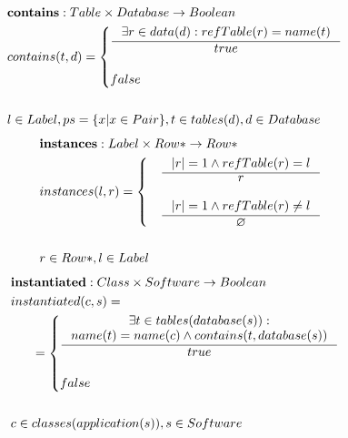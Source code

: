\documentclass[11pt]{article}
\begin{document}
\begin{align*}
&	\mathbf{contains} : Table \times Database \rightarrow Boolean \\
&	contains(t, d) = \begin{cases}
			\inference{\exists r \in data(d) : refTable(r) = name(t) }{true} \\ \\
		 	false
 		\end{cases} \\ \\
& l \in Label, ps  = \{ x | x \in Pair\}, t \in tables(d), d \in Database
\end{align*}
\begin{align*}
&	\mathbf{instances} : Label \times Row* \rightarrow Row* \\
&	instances(l, r) = \begin{cases}
&		\inference{|r| = 1 \wedge refTable(r) = l}{r}\\\\
& 		\inference{|r| = 1 \wedge refTable(r) \neq l}{\varnothing}
 \end{cases} \\ \\
&	r \in Row*, l \in Label
\end{align*}
\begin{align*}
&	\mathbf{instantiated} : Class \times Software \rightarrow Boolean \\
&	instantiated(c, s) =\\
& \;\;\;\;\;\; = \begin{cases} \inference{\exists t \in tables(database(s)) : \\ name(t) = name(c)  \wedge contains(t, database(s))}{true} \\ \\
  false
 \end{cases} \\ \\
&	 c \in classes(application(s)), s \in Software 
\end{align*}
\end{document}
